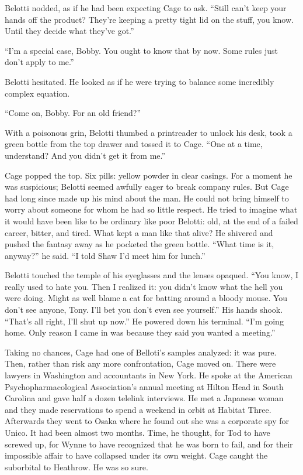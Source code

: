 Belotti nodded, as if he had been expecting Cage to ask. ``Still can't keep your hands off the product? They're keeping a pretty tight lid on the stuff, you know. Until they decide what they've got.''

``I'm a special case, Bobby. You ought to know that by now. Some rules just don't apply to me.''

Belotti hesitated. He looked as if he were trying to balance some incredibly complex equation.

``Come on, Bobby. For an old friend?''

With a poisonous grin, Belotti thumbed a printreader to unlock his desk, took a green bottle from the top drawer and tossed it to Cage. ``One at a time, understand? And you didn't get it from me.''

Cage popped the top. Six pills: yellow powder in clear casings. For a moment he was suspicious; Belotti seemed awfully eager to break company rules. But Cage had long since made up his mind about the man. He could not bring himself to worry about someone for whom he had so little respect. He tried to imagine what it would have been like to be ordinary like poor Belotti: old, at the end of a failed career, bitter, and tired. What kept a man like that alive? He shivered and pushed the fantasy away as he pocketed the green bottle. ``What time is it, anyway?'' he said. ``I told Shaw I'd meet him for lunch.''

Belotti touched the temple of his eyeglasses and the lenses opaqued. ``You know, I really used to hate you. Then I realized it: you didn't know what the hell you were doing. Might as well blame a cat for batting around a bloody mouse. You don't see anyone, Tony. I'll bet you don't even see yourself.'' His hands shook. ``That's all right, I'll shut up now.'' He powered down his terminal. ``I'm going home. Only reason I came in was because they said you wanted a meeting.''

Taking no chances, Cage had one of Belloti's samples analyzed: it was pure. Then, rather than risk any more confrontation, Cage moved on. There were lawyers in Washington and accountants in New York. He spoke at the American Psychopharmacological Association's annual meeting at Hilton Head in South Carolina and gave half a dozen telelink interviews. He met a Japanese woman and they made reservations to spend a weekend in orbit at Habitat Three. Afterwards they went to Osaka where he found out she was a corporate spy for Unico. It had been almost two months. Time, he thought, for Tod to have screwed up, for Wynne to have recognized that he was born to fail, and for their impossible affair to have collapsed under its own weight. Cage caught the suborbital to Heathrow. He was so sure.

